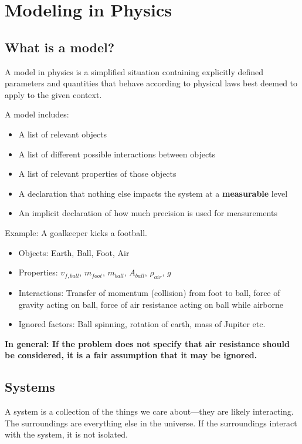 \documentclass{article}
\begin{document}
\pagebreak
\section{Modeling in Physics}
\subsection{What is a model?}
A model in physics is a simplified situation containing explicitly defined parameters and quantities that behave according to physical laws best deemed to apply to the given context. 

\vspace{5mm} %

A model includes:

\begin{itemize}
    \item A list of relevant objects
    \item A list of different possible interactions between objects
    \item A list of relevant properties of those objects
    \item A declaration that nothing else impacts the system at a \textbf{measurable} level
    \item An implicit declaration of how much precision is used for measurements

\end{itemize}
Example: A goalkeeper kicks a football.

\begin{itemize}
    \item Objects: Earth, Ball, Foot, Air
    \item Properties: $v_{f,ball}$, \text{ } $m_{foot}$, \text{ } $m_{ball}$, \text{ } $A_{ball}$, \text{ } $\rho_{air}$, \text{ } $g$
    \item Interactions: Transfer of momentum (collision) from foot to ball, force of gravity acting on ball, force of air resistance acting on ball while airborne
    \item Ignored factors: Ball spinning, rotation of earth, mass of Jupiter etc.
\end{itemize}

\textbf{In general: If the problem does not specify that air resistance should be considered, it is a fair assumption that it may be ignored.}

\subsection{Systems}
A system is a collection of the things we care about---they are likely interacting. The surroundings are everything else in the universe. If the surroundings interact with the system, it is not isolated.
\pagebreak
\end{document}
